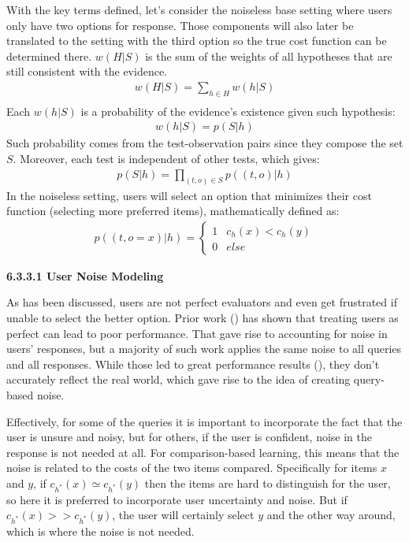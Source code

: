 \documentclass[
  letterpaper,
  numbers=noenddot,
  DIV=11,
  oneside]{scrreprt}
\theoremstyle{remark}
\begin{document}
With the key terms defined, let's consider the noiseless base setting
where users only have two options for response. Those components will
also later be translated to the setting with the third option so the
true cost function can be determined there. \(w(H|S)\) is the sum of the
weights of all hypotheses that are still consistent with the evidence.
\[\begin{aligned}
    w(H|S) = \sum_{h \in H} w(h | S)\\
\end{aligned}\] Each \(w(h|S)\) is a probability of the evidence's
existence given such hypothesis: \[\begin{aligned}
    w(h|S) = p(S|h)
\end{aligned}\] Such probability comes from the test-observation pairs
since they compose the set \(S\). Moreover, each test is independent of
other tests, which gives: \[\begin{aligned}
    p(S|h) = \prod_{(t,o) \in S} p((t,o) | h)
\end{aligned}\] In the noiseless setting, users will select an option
that minimizes their cost function (selecting more preferred items),
mathematically defined as: \[\begin{aligned}
    p((t, o = x) | h) = 
    \begin{cases}
        1 & c_h(x) < c_h(y)\\
        0 & else
    \end{cases}
    \label{eq:prob_base}
\end{aligned}\]

\textbf{6.3.3.1 User Noise Modeling}

As has been discussed, users are not perfect evaluators and even get
frustrated if unable to select the better option. Prior work
() has shown that
treating users as perfect can lead to poor performance. That gave rise
to accounting for noise in users' responses, but a majority of such work
applies the same noise to all queries and all responses. While those led
to great performance results (), they don't accurately reflect the real world, which gave
rise to the idea of creating query-based noise.

Effectively, for some of the queries it is important to incorporate the
fact that the user is unsure and noisy, but for others, if the user is
confident, noise in the response is not needed at all. For
comparison-based learning, this means that the noise is related to the
costs of the two items compared. Specifically for items \(x\) and \(y\),
if \(c_{h^*}(x) \simeq c_{h^*}(y)\) then the items are hard to
distinguish for the user, so here it is preferred to incorporate user
uncertainty and noise. But if \(c_{h^*}(x) >> c_{h^*}(y)\), the user
will certainly select \(y\) and the other way around, which is where the
noise is not needed.
\end{document}
